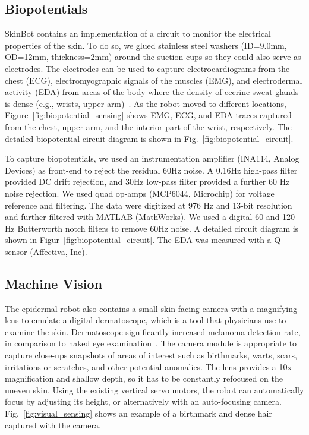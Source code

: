 \subsection{Biopotentials}
SkinBot contains an implementation of a circuit to monitor the electrical properties of the skin. To do so, we glued stainless steel washers (ID=9.0mm, OD=12mm, thickness=2mm) around the suction cups so they could also serve as electrodes. The electrodes can be used to capture electrocardiograms from the chest (ECG), electromyographic signals of the muscles (EMG), and electrodermal activity (EDA) from areas of the body where the density of eccrine sweat glands is dense (e.g., wrists, upper arm)~\cite{boucsein2012electrodermal}. As the robot moved to different locations, Figure~\ref{fig:biopotential_sensing} shows EMG, ECG, and EDA traces captured from the chest, upper arm, and the interior part of the wrist, respectively. The detailed biopotential circuit diagram is shown in Fig.~\ref{fig:biopotential_circuit}. 

To capture biopotentials, we used an instrumentation amplifier (INA114, Analog Devices) as front-end to reject the residual 60Hz noise. A 0.16Hz high-pass filter provided DC drift rejection, and 30Hz low-pass filter provided a further 60 Hz noise rejection. We used quad op-amps (MCP6044, Microchip) for voltage reference and filtering. The data were digitized at 976 Hz and 13-bit resolution and further filtered with MATLAB (MathWorks). We used a digital 60 and 120 Hz Butterworth notch filters to remove 60Hz noise. A detailed circuit diagram is shown in Figur~\ref{fig:biopotential_circuit}. The EDA was measured with a Q-sensor (Affectiva, Inc). 

\subsection{Machine Vision}
 The epidermal robot also contains a small skin-facing camera with a magnifying lens to emulate a digital dermatoscope, which is a tool that physicians use to examine the skin. Dermatoscope significantly increased melanoma detection rate, in comparison to naked eye examination~\cite{lorentzen1999clinical}. The camera module is appropriate to capture close-ups snapshots of areas of interest such as birthmarks, warts, scars, irritations or scratches, and other potential anomalies. The lens provides a 10x magnification and shallow depth, so it has to be constantly refocused on the uneven skin. Using the existing vertical servo motors, the robot can automatically focus by adjusting its height, or alternatively with an auto-focusing camera. Fig.~\ref{fig:visual_sensing} shows an example of a birthmark and dense hair captured with the camera. 

